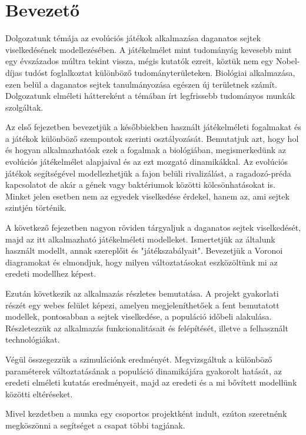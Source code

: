 \chapter{Bevezető}

Dolgozatunk témája az evolúciós játékok alkalmazása daganatos sejtek viselkedésének modellezésében. A játékelmélet mint tudományág kevesebb mint egy évszázados múltra tekint vissza, mégis kutatók ezreit, köztük nem egy Nobel-díjas tudóst foglalkoztat különböző tudományterületeken. Biológiai alkalmazása, ezen belül a daganatos sejtek tanulmányozása egészen új területnek számít. Dolgozatunk elméleti háttereként a témában írt legfrissebb tudományos munkák szolgáltak.

Az első fejezetben bevezetjük a későbbiekben használt játékelméleti fogalmakat és a játékok különböző szempontok szerinti osztályozását. Bemutatjuk azt, hogy hol és hogyan alkalmazhatóak ezek a fogalmak a biológiában, megismerkedünk az evolúciós játékelmélet alapjaival és az ezt mozgató dinamikákkal. Az evolúciós játékok segítségével modellezhetjük a fajon belüli rivalizálást, a ragadozó-préda kapcsolatot de akár a gének vagy baktériumok közötti kölcsönhatásokat is. Minket jelen esetben nem az egyedek viselkedése érdekel, hanem az, ami sejtek szintjén történik.

A következő fejezetben nagyon röviden tárgyaljuk a daganatos sejtek viselkedését, majd az itt alkalmazható játékelméleti modelleket. Ismertetjük az általunk használt modellt, annak szereplőit és "játékszabályait". Bevezetjük a Voronoi diagramokat és elmondjuk, hogy milyen változtatásokat eszközöltünk mi az eredeti modellhez képest. 

Ezután következik az alkalmazás részletes bemutatása. A projekt gyakorlati részét egy webes felület képezi, amelyen megjeleníthetőek a fent bemutatott modellek, pontosabban a sejtek viselkedése, a populáció időbeli alakulása. Részletezzük az alkalmazás funkcionalitásait és felépítését, illetve a felhasznált technológiákat.

Végül összegezzük a szimulációnk eredményét. Megvizsgáltuk a különböző paraméterek változtatásának a populáció dinamikájára gyakorolt hatását, az eredeti elméleti kutatás eredményeit, majd az eredeti és a mi bővített modellünk közötti eltéréseket.

Mivel kezdetben a munka egy csoportos projektként indult, ezúton szeretnénk megköszönni a segítséget a csapat többi tagjának.